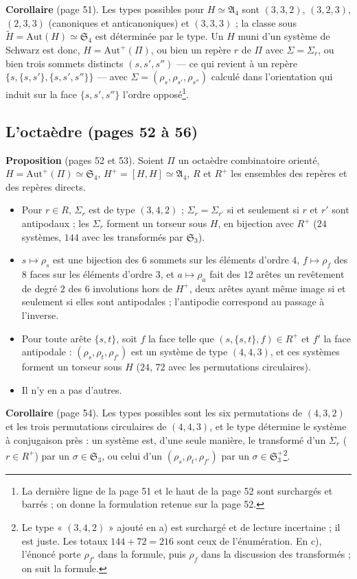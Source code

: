 \documentclass[11pt,a4paper]{article}
\begin{document}
\textbf{Corollaire} (page 51). Les types possibles pour $H \simeq \mathfrak{A}_4$
sont $(3, 3, 2)$, $(3, 2, 3)$, $(2, 3, 3)$ (canoniques et anticanoniques) et
$(3, 3, 3)$ ; la classe sous $\widetilde H = \mathrm{Aut}(H) \simeq
\mathfrak{S}_4$ est déterminée par le type. Un $H$ muni d'un système de Schwarz
est donc, $H = \mathrm{Aut}^+(\Pi)$, ou bien un repère $r$ de $\Pi$ avec
$\Sigma = \Sigma_r$, ou bien trois sommets distincts $(s, s', s'')$ --- ce qui
revient à un repère $\{s, \{s, s'\}, \{s, s', s''\}\}$ --- avec $\Sigma =
(\rho_s, \rho_{s'}, \rho_{s''})$ calculé dans l'orientation qui induit sur la
face $\{s, s', s''\}$ l'ordre opposé\footnote{La dernière ligne de la page 51 et
le haut de la page 52 sont surchargés et barrés ; on donne la formulation
retenue sur la page 52.}.

\subsection*{L'octaèdre (pages 52 à 56)}

\textbf{Proposition} (pages 52 et 53). Soient $\Pi$ un octaèdre combinatoire
orienté, $H = \mathrm{Aut}^+(\Pi) \simeq \mathfrak{S}_4$, $H^+ = [H, H] \simeq
\mathfrak{A}_4$, $R$ et $R^+$ les ensembles des repères et des repères directs.
\begin{itemize}
  \item[a)] Pour $r \in R$, $\Sigma_r$ est de type $(3, 4, 2)$ ; $\Sigma_r =
    \Sigma_{r'}$ si et seulement si $r$ et $r'$ sont antipodaux ; les $\Sigma_r$
    forment un torseur sous $H$, en bijection avec $R^+$ ($24$ systèmes, $144$
    avec les transformés par $\mathfrak{S}_3$).
  \item[b)] $s \mapsto \rho_s$ est une bijection des $6$ sommets sur les
    éléments d'ordre $4$, $f \mapsto \rho_f$ des $8$ faces sur les éléments
    d'ordre $3$, et $a \mapsto \rho_a$ fait des $12$ arêtes un revêtement de
    degré $2$ des $6$ involutions hors de $H^+$, deux arêtes ayant même image si
    et seulement si elles sont antipodales ; l'antipodie correspond au passage
    à l'inverse.
  \item[c)] Pour toute arête $\{s, t\}$, soit $f$ la face telle que $(s, \{s,
    t\}, f) \in R^+$ et $f'$ la face antipodale : $(\rho_s, \rho_t, \rho_{f'})$
    est un système de type $(4, 4, 3)$, et ces systèmes forment un torseur
    sous $H$ ($24$, $72$ avec les permutations circulaires).
  \item[d)] Il n'y en a pas d'autres.
\end{itemize}
\textbf{Corollaire} (page 54). Les types possibles sont les six permutations de
$(4, 3, 2)$ et les trois permutations circulaires de $(4, 4, 3)$, et le type
détermine le système à conjugaison près : un système est, d'une seule
manière, le transformé d'un $\Sigma_r$ ($r \in R^+$) par un $\sigma \in
\mathfrak{S}_3$, ou celui d'un $(\rho_s, \rho_t, \rho_{f'})$ par un $\sigma \in
\mathfrak{S}_3^+$\footnote{Le type « $(3, 4, 2)$ » ajouté en a) est surchargé et
de lecture incertaine ; il est juste. Les totaux $144 + 72 = 216$ sont ceux de
l'énumération. En c), l'énoncé porte $\rho_{f'}$ dans la formule, puis $\rho_f$
dans la discussion des transformés ; on suit la formule.}.
\end{document}
